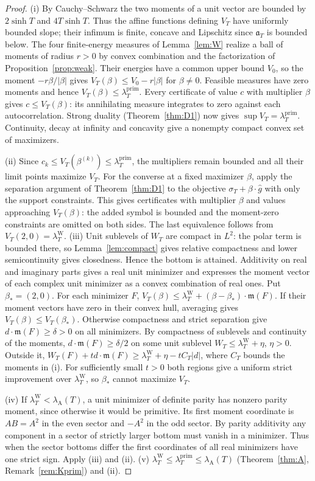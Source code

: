 \documentclass[10pt]{amsart}
\theoremstyle{definition}
\theoremstyle{remark}
\newcommand{\lamP}{\lambda^{\mathrm{prim}}_T}
\newcommand{\lamW}{\lambda^{\mathrm W}_T}
\newcommand{\lamA}{\lambda_{\mathrm A}(T)}
\newcommand{\sT}{\sigma_T}
\begin{document}
\begin{proof}
(i) By Cauchy--Schwarz the two moments of a unit vector are bounded
by $2\sinh T$ and $4T\sinh T$. Thus the affine functions defining
$V_T$ have uniformly bounded slope; their infimum is finite, concave
and Lipschitz since $\mathfrak a_T$ is bounded below.
The four finite-energy measures of Lemma~\ref{lem:W} realize a ball
of moments of radius $r>0$ by convex combination and the factorization
of Proposition~\ref{prop:weak}. Their energies have a common upper
bound $V_0$, so the moment $-r\beta/|\beta|$ gives
$V_T(\beta)\le V_0-r|\beta|$ for $\beta\ne0$. Feasible measures
have zero moments and hence $V_T(\beta)\le\lamP$. Every certificate
of value $c$ with multiplier $\beta$ gives $c\le V_T(\beta)$:
its annihilating measure integrates to zero against each autocorrelation.
Strong duality (Theorem~\ref{thm:D1}) now gives $\sup V_T=\lamP$.
Continuity, decay at infinity and concavity give a nonempty compact
convex set of maximizers.

(ii) Since $c_k\le V_T(\beta^{(k)})\le\lamP$, the multipliers
remain bounded and all their limit points maximize $V_T$.
For the converse at a fixed maximizer $\beta$, apply the separation
argument of Theorem~\ref{thm:D1} to the objective
$\sT+\beta\cdot\widehat g$ with only the support constraints.
This gives certificates with multiplier $\beta$ and values approaching
$V_T(\beta)$: the added symbol is bounded and the moment-zero
constraints are omitted on both sides. The last equivalence follows
from $V_T(2,0)=\lamW$.
(iii) Unit sublevels of $W_T$ are compact in $L^2$: the polar
term is bounded there, so Lemma~\ref{lem:compact} gives relative
compactness and lower semicontinuity gives closedness. Hence the
bottom is attained. Additivity on real and imaginary parts gives
a real unit minimizer and expresses the moment vector of each
complex unit minimizer as a convex combination of real ones.
Put $\beta_*=(2,0)$. For each minimizer $F$,
$V_T(\beta)\le\lamW+(\beta-\beta_*)\cdot\mathfrak m(F)$.
If their moment vectors have zero in their convex hull, averaging
gives $V_T(\beta)\le V_T(\beta_*)$. Otherwise compactness and
strict separation give $d\cdot\mathfrak m(F)\ge\delta>0$ on all
minimizers. By compactness of sublevels and continuity of the moments,
$d\cdot\mathfrak m(F)\ge\delta/2$ on some unit sublevel
$W_T\le\lamW+\eta$, $\eta>0$. Outside it,
$W_T(F)+t d\cdot\mathfrak m(F)\ge\lamW+\eta-t C_T|d|$,
where $C_T$ bounds the moments in (i). For sufficiently small $t>0$
both regions give a uniform strict improvement over $\lamW$,
so $\beta_*$ cannot maximize $V_T$.

(iv) If $\lamW<\lamA$, a unit minimizer of definite parity
has nonzero parity moment, since otherwise it would be primitive.
Its first moment coordinate is $A B=A^2$ in the even sector and
$-A^2$ in the odd sector. By parity additivity any component
in a sector of strictly larger bottom must vanish in a minimizer.
Thus when the sector bottoms differ the first coordinates of all
real minimizers have one strict sign. Apply (iii) and (ii).
(v) $\lamW\le\lamP\le\lamA$ (Theorem~\ref{thm:A}, Remark~\ref{rem:Kprim}) and (ii).
\end{proof}
\end{document}
